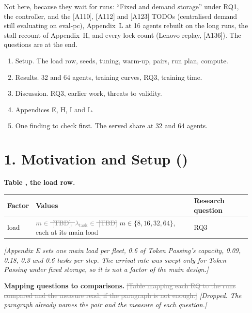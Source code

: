 \documentclass[11pt,a4paper]{article}
\newcommand{\new}[1]{\textcolor{newc}{#1}}
\newcommand{\old}[1]{\textcolor{gray}{\sout{#1}}}
\newcommand{\note}[1]{{\small\itshape [#1]}}
\newcommand{\lab}[1]{\textsf{\footnotesize\detokenize{#1}}}
\begin{document}
Not here, because they wait for runs: ``Fixed and demand storage'' under RQ1,
the controller, and the [A110], [A112] and [A123] TODOs (centralised demand
still evaluating on eval-pc), Appendix~L at 16 agents rebuilt on the long
runs, the stall recount of Appendix~H, and every lock count (Lenovo replay,
[A136]). The questions are at the end.

\begin{enumerate}[nosep]
  \item Setup. The load row, seeds, tuning, warm-up, pairs, run plan, compute.
  \item Results. 32 and 64 agents, training curves, RQ3, training time.
  \item Discussion. RQ3, earlier work, threats to validity.
  \item Appendices E, H, I and L.
  \item One finding to check first. The served share at 32 and 64 agents.
\end{enumerate}

\section*{1. Motivation and Setup (\lab{sec:exp:setup})}

\textbf{Table \lab{tab:expfactors}, the load row.}

\begin{tabular}{lll}
  \toprule
  Factor & Values & Research question \\
  \midrule
  load & \old{$m \in$ [TBD], $\lambda_{\mathrm{task}} \in$ [TBD]}
         \new{$m \in \{8, 16, 32, 64\}$, each at its main load} & RQ3 \\
  \bottomrule
\end{tabular}

\note{Appendix E sets one main load per fleet, 0.6 of Token Passing's capacity,
0.09, 0.18, 0.3 and 0.6 tasks per step. The arrival rate was swept only for
Token Passing under fixed storage, so it is not a factor of the main design.}

\textbf{Mapping questions to comparisons.} \old{[Table mapping each RQ to the
runs compared and the measure read, if the paragraph is not enough.]}
\note{Dropped. The paragraph already names the pair and the measure of each
question.}
\end{document}
